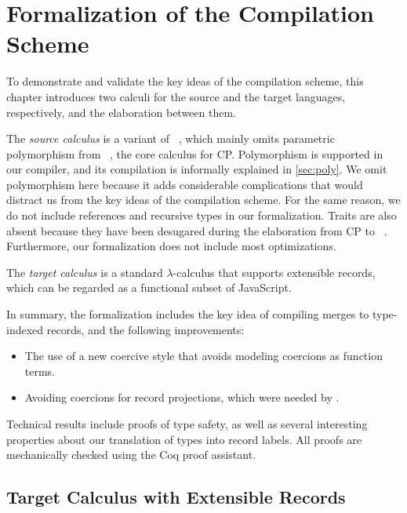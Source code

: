 \chapter{Formalization of the Compilation Scheme} \label{ch:calculi}

To demonstrate and validate the key ideas of the compilation scheme, this
chapter introduces two calculi for the source and the target languages,
respectively, and the elaboration between them.

The \emph{source calculus} is a variant of
\lambdaiplus~\citep{bi2018essence,huang2021taming}, which mainly omits
parametric polymorphism from \fiplus~\citep{bi2019distributive,fan2022direct},
the core calculus for CP. Polymorphism is supported in our compiler, and its
compilation is informally explained in \autoref{sec:poly}. We omit polymorphism
here because it adds considerable complications that would distract us from the
key ideas of the compilation scheme. For the same reason, we do not include
references and recursive types in our formalization. Traits are also absent
because they have been desugared during the elaboration from CP to
\fiplus~\citep{zhang2021compositional}. Furthermore, our formalization does not
include most optimizations.

The \emph{target calculus} \lambdar is a standard $\lambda$-calculus that
supports extensible records, which can be regarded as a functional subset of
JavaScript.

In summary, the formalization includes the key idea of compiling merges to
type-indexed records, and the following improvements:
\begin{itemize}
\item The use of a new coercive style that avoids modeling coercions as function
      terms.
\item Avoiding coercions for record projections, which were needed by
      \citet{fan2022direct}.
\end{itemize}
Technical results include proofs of type safety, as well as several interesting
properties about our translation of types into record labels. All proofs are
mechanically checked using the Coq proof assistant.

\section{Target Calculus with Extensible Records}

